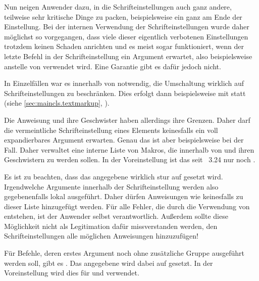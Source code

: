 Nun neigen Anwender dazu, in die Schrifteinstellungen auch ganz andere,
teilweise sehr kritische Dinge zu packen, beispielsweise ein
 ganz am Ende der Einstellung. Bei der internen
Verwendung der Schrifteinstellungen wurde daher möglichst so vorgegangen, dass
viele dieser eigentlich verbotenen Einstellungen trotzdem keinen Schaden
anrichten und es meist sogar funktioniert, wenn der letzte Befehl in der
Schrifteinstellung ein Argument erwartet, also beispielsweise 
anstelle von  verwendet wird. Eine Garantie gibt es dafür
jedoch nicht. 

In Einzelfällen war es innerhalb von \KOMAScript{} notwendig, die Umschaltung
wirklich auf Schrifteinstellungen zu beschränken. Dies erfolgt dann
beispielsweise mit
%
%
%
 statt  (siehe
\autoref{sec:maincls.textmarkup},
).

Die Anweisung  und ihre Geschwister
haben allerdings ihre Grenzen. Daher darf die vermeintliche Schrifteinstellung
eines Elements keinesfalls ein voll expandierbares Argument erwarten. Genau
das ist aber beispielsweise bei  der
Fall. Daher verwaltet \KOMAScript{} eine interne Liste von Makros, die
innerhalb von  und ihren Geschwistern
zu  werden sollen. In der Voreinstellung ist das seit
\KOMAScript~3.24 nur noch .

Es ist zu beachten, dass das angegebene  wirklich stur auf
 gesetzt wird. Irgendwelche Argumente innerhalb der
Schrifteinstellung werden also gegebenenfalls lokal ausgeführt. Daher dürfen
Anweisungen wie  keinesfalls zu dieser Liste hinzugefügt
werden. Für alle Fehler, die durch die Verwendung von
 entstehen, ist der Anwender selbst
verantwortlich. Außerdem sollte diese Möglichkeit nicht als Legitimation dafür
missverstanden werden, den Schrifteinstellungen alle möglichen Anweisungen
hinzuzufügen!

Für Befehle, deren erstes Argument noch ohne zusätzliche
Gruppe ausgeführt werden soll, gibt es
. Das angegebene  wird dabei auf
 gesetzt. In der Voreinstellung wird dies für
 und  verwendet.

